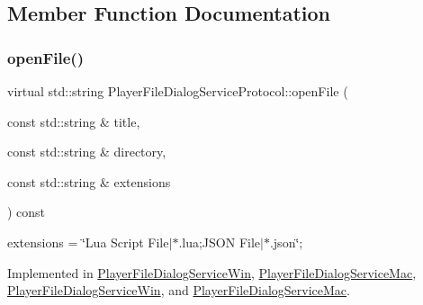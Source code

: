 \subsection{Member Function Documentation}
\mbox{\label{classPlayerFileDialogServiceProtocol_ac9ef6f506a2ad68bcec05a0029b5cf83}} 
\subsubsection{\texorpdfstring{open\+File()}{openFile()}\hspace{0.1cm}{\footnotesize\ttfamily [1/2]}}
{\footnotesize\ttfamily virtual std\+::string Player\+File\+Dialog\+Service\+Protocol\+::open\+File (\begin{DoxyParamCaption}\item[{const std\+::string \&}]{title,  }\item[{const std\+::string \&}]{directory,  }\item[{const std\+::string \&}]{extensions }\end{DoxyParamCaption}) const\hspace{0.3cm}{\ttfamily [pure virtual]}}

extensions = \char`\"{}\+Lua Script File$\vert$$\ast$.\+lua;\+J\+S\+O\+N File$\vert$$\ast$.\+json\char`\"{}; 

Implemented in \hyperlink{classPlayerFileDialogServiceWin_a110a061dc10c59cba4cb202316e970b4}{Player\+File\+Dialog\+Service\+Win}, \hyperlink{classPlayerFileDialogServiceMac_a79a6a3ca54cdb15fec5d0a9caeafabde}{Player\+File\+Dialog\+Service\+Mac}, \hyperlink{classPlayerFileDialogServiceWin_a1766752253a53e3b0a2c612d915b4453}{Player\+File\+Dialog\+Service\+Win}, and \hyperlink{classPlayerFileDialogServiceMac_a8752560c26dc0d249dd33ea47309a289}{Player\+File\+Dialog\+Service\+Mac}.

\mbox{\label{classPlayerFileDialogServiceProtocol_ac9ef6f506a2ad68bcec05a0029b5cf83}} 
